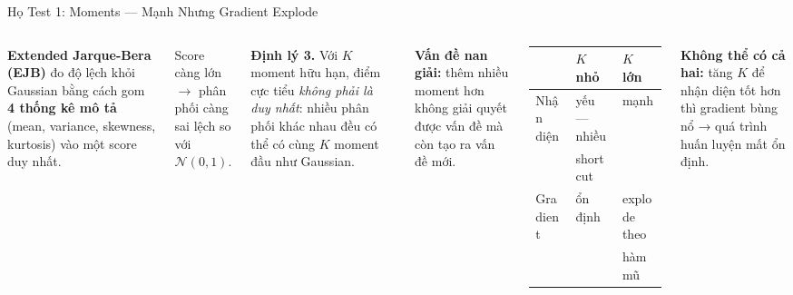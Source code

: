 \documentclass[aspectratio=169,9pt]{beamer}
\begin{document}
\begin{frame}{Họ Test 1: Moments — Mạnh Nhưng Gradient Explode}

\begin{columns}[T]

\textbf{Extended Jarque-Bera (EJB)} đo độ lệch khỏi Gaussian bằng cách gom \textbf{4 thống kê mô tả} (mean, variance, skewness, kurtosis) vào một score duy nhất.

\vspace{0.3em}
Score càng lớn $\rightarrow$ phân phối càng sai lệch so với $\mathcal{N}(0,1)$.

\vspace{0.5em}


\vspace{0.3em}

\begin{badbox}
\footnotesize\textbf{Định lý 3.} Với $K$ moment hữu hạn, điểm cực tiểu \emph{không phải là duy nhất}: nhiều phân phối khác nhau đều có thể có cùng $K$ moment đầu như Gaussian.
\end{badbox}

\vspace{0.5em}
\textbf{Vấn đề nan giải:} thêm nhiều moment hơn không giải quyết được vấn đề mà còn tạo ra vấn đề mới.

\vspace{0.5em}
\begin{tabular}{@{}lll@{}}
\toprule
 & $K$ nhỏ & $K$ lớn \\
\midrule
Nhận diện & \textcolor{mbad}{yếu} — nhiều & \textcolor{mgood}{mạnh} \\
& shortcut & \\
Gradient & \textcolor{mgood}{ổn định} & \textcolor{mbad}{explode} theo \\
& & hàm mũ \\
\bottomrule
\end{tabular}

\vspace{0.6em}
\begin{badbox}
\footnotesize\textbf{Không thể có cả hai:} tăng $K$ để nhận diện tốt hơn thì gradient bùng nổ → quá trình huấn luyện mất ổn định.
\end{badbox}

\end{columns}
\end{frame}
\end{document}
